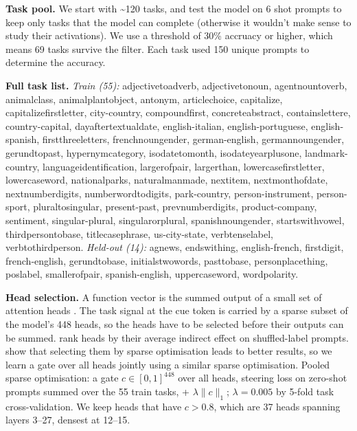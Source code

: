 \documentclass{article}
\renewcommand{\_}{\textunderscore\allowbreak}
\begin{document}
\textbf{Task pool.} We start with \textasciitilde120 tasks, and test the model on 6 shot prompts to keep only tasks that the model can complete (otherwise it wouldn't make sense to study their activations). We use a threshold of 30\% accruacy or higher, which means 69 tasks survive the filter. Each task used 150 unique prompts to determine the accuracy.

\textbf{Full task list.} \emph{Train (55):} adjective\_to\_adverb, adjective\_to\_noun, agent\_noun\_to\_verb, animal\_class, animal\_plant\_object, antonym, article\_choice, capitalize, capitalize\_first\_letter, city-country, compound\_first, concrete\_abstract, contains\_letter\_e, country-capital, day\_after\_textual\_date, english-italian, english-portuguese, english-spanish, first\_three\_letters, french\_noun\_gender, german-english, german\_noun\_gender, gerund\_to\_past, hypernym\_category, iso\_date\_to\_month, iso\_date\_year\_plus\_one, landmark-country, language\_identification, larger\_of\_pair, larger\_than\_1000, lowercase\_first\_letter, lowercase\_word, national\_parks, natural\_manmade, next\_item, next\_month\_of\_date, next\_number\_digits, number\_word\_to\_digits, park-country, person-instrument, person-sport, plural\_to\_singular, present-past, prev\_number\_digits, product-company, sentiment, singular-plural, singular\_or\_plural, spanish\_noun\_gender, starts\_with\_vowel, third\_person\_to\_base, titlecase\_phrase, us-city-state, verb\_tense\_label, verb\_to\_third\_person. \emph{Held-out (14):} ag\_news, ends\_with\_ing, english-french, first\_digit, french-english, gerund\_to\_base, initials\_two\_words, past\_to\_base, person\_place\_thing, pos\_label, smaller\_of\_pair, spanish-english, uppercase\_word, word\_polarity.

\textbf{Head selection.} A function vector is the summed output of a small set of attention heads \citep{todd2024function}. The task signal at the cue token is carried by a sparse subset of the model's 448 heads, so the heads have to be selected before their outputs can be summed. \citeauthor{todd2024function} rank heads by their average indirect effect on shuffled-label prompts. \citet{hu2025addition} show that selecting them by sparse optimisation leads to better results, so we learn a gate over all heads jointly using a similar sparse optimisation. Pooled sparse optimisation: a gate \(c \in [0,1]^{448}\) over all heads, steering loss on zero-shot prompts summed over the 55 train tasks, + \(\lambda\|c\|_1\); \(\lambda = 0.005\) by 5-fold task cross-validation. We keep heads that have \(c > 0.8\), which are 37 heads spanning layers 3--27, densest at 12--15.
\end{document}
